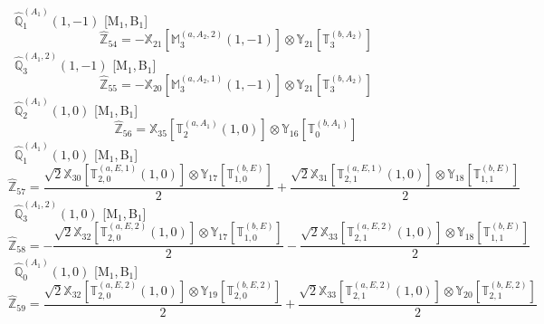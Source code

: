 \documentclass[fleqn,10pt,landscape]{article}
\begin{document}
\begin{itemize}
\begin{dmath*}
\end{dmath*}
\vspace{4mm}
\noindent {} $\,\,\,\hat{\mathbb{Q}}_{1}^{(A_{1})}(1,-1)$ [M$_{1}$,\,B$_{1}$]
\begin{dmath*}
\hat{\mathbb{Z}}_{54}=- \mathbb{X}_{21}[\mathbb{M}_{3}^{(a,A_{2},2)}(1,-1)] \otimes\mathbb{Y}_{21}[\mathbb{T}_{3}^{(b,A_{2})}]
\end{dmath*}
\vspace{4mm}
\noindent {} $\,\,\,\hat{\mathbb{Q}}_{3}^{(A_{1},2)}(1,-1)$ [M$_{1}$,\,B$_{1}$]
\begin{dmath*}
\hat{\mathbb{Z}}_{55}=- \mathbb{X}_{20}[\mathbb{M}_{3}^{(a,A_{2},1)}(1,-1)] \otimes\mathbb{Y}_{21}[\mathbb{T}_{3}^{(b,A_{2})}]
\end{dmath*}
\vspace{4mm}
\noindent {} $\,\,\,\hat{\mathbb{Q}}_{2}^{(A_{1})}(1,0)$ [M$_{1}$,\,B$_{1}$]
\begin{dmath*}
\hat{\mathbb{Z}}_{56}=\mathbb{X}_{35}[\mathbb{T}_{2}^{(a,A_{1})}(1,0)] \otimes\mathbb{Y}_{16}[\mathbb{T}_{0}^{(b,A_{1})}]
\end{dmath*}
\vspace{4mm}
\noindent {} $\,\,\,\hat{\mathbb{Q}}_{1}^{(A_{1})}(1,0)$ [M$_{1}$,\,B$_{1}$]
\begin{dmath*}
\hat{\mathbb{Z}}_{57}=\frac{\sqrt{2} \mathbb{X}_{30}[\mathbb{T}_{2,0}^{(a,E,1)}(1,0)] \otimes\mathbb{Y}_{17}[\mathbb{T}_{1,0}^{(b,E)}]}{2} + \frac{\sqrt{2} \mathbb{X}_{31}[\mathbb{T}_{2,1}^{(a,E,1)}(1,0)] \otimes\mathbb{Y}_{18}[\mathbb{T}_{1,1}^{(b,E)}]}{2}
\end{dmath*}
\vspace{4mm}
\noindent {} $\,\,\,\hat{\mathbb{Q}}_{3}^{(A_{1},2)}(1,0)$ [M$_{1}$,\,B$_{1}$]
\begin{dmath*}
\hat{\mathbb{Z}}_{58}=- \frac{\sqrt{2} \mathbb{X}_{32}[\mathbb{T}_{2,0}^{(a,E,2)}(1,0)] \otimes\mathbb{Y}_{17}[\mathbb{T}_{1,0}^{(b,E)}]}{2} - \frac{\sqrt{2} \mathbb{X}_{33}[\mathbb{T}_{2,1}^{(a,E,2)}(1,0)] \otimes\mathbb{Y}_{18}[\mathbb{T}_{1,1}^{(b,E)}]}{2}
\end{dmath*}
\vspace{4mm}
\noindent {} $\,\,\,\hat{\mathbb{Q}}_{0}^{(A_{1})}(1,0)$ [M$_{1}$,\,B$_{1}$]
\begin{dmath*}
\hat{\mathbb{Z}}_{59}=\frac{\sqrt{2} \mathbb{X}_{32}[\mathbb{T}_{2,0}^{(a,E,2)}(1,0)] \otimes\mathbb{Y}_{19}[\mathbb{T}_{2,0}^{(b,E,2)}]}{2} + \frac{\sqrt{2} \mathbb{X}_{33}[\mathbb{T}_{2,1}^{(a,E,2)}(1,0)] \otimes\mathbb{Y}_{20}[\mathbb{T}_{2,1}^{(b,E,2)}]}{2}

\end{dmath*}
\end{itemize}
\end{document}
